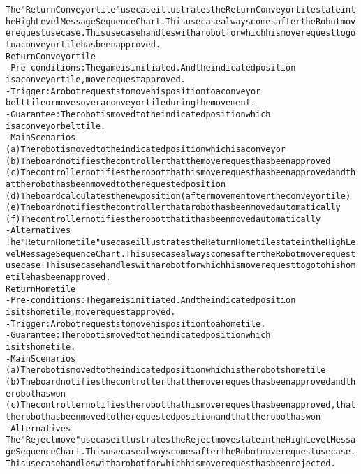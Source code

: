 \begin{alltt}
The "Return Conveyor tile" use case illustrates the Return Conveyor tile state in the High Level Message Sequence Chart. This use case always comes after the Robot move request use case. This use case handles with a robot for which his move request to go to a conveyor tile has been approved. \\

Return Conveyor tile
- Pre-conditions: The game is initiated. And the indicated position
    is a conveyor tile, move request approved.
- Trigger: A robot requests to move his position to a conveyor
    belt tile or moves over a conveyor tile during the movement.
- Guarantee: The robot is moved to the indicated position which
    is a conveyor belt tile.
- Main Scenarios
    (a) The robot is moved to the indicated position which is a conveyor
    (b) The board notifies the controller that the move request has been approved
    (c) The controller notifies the robot that his move request has been approved and that the robot has been moved to the requested position
    (d) The board calculates the new position (after movement over the conveyor tile)
    (e) The board notifies the controller that a robot has been moved automatically
    (f) The controller notifies the robot that it has been moved automatically
- Alternatives \\

The "Return Home tile" use case illustrates the Return Home tile state in the High Level Message Sequence Chart. This use case always comes after the Robot move request use case. This use case handles with a robot for which his move request to go to his home tile has been approved. \\

Return Home tile
- Pre-conditions: The game is initiated. And the indicated position
    is its home tile, move request approved.
- Trigger: A robot requests to move his position to a home tile.
- Guarantee: The robot is moved to the indicated position which
    is its home tile.
- Main Scenarios
    (a) The robot is moved to the indicated position which is the robots home tile
    (b) The board notifies the controller that the move request has been approved and the robot has won
    (c) The controller notifies the robot that his move request has been approved, that the robot has been moved to the requested position and that the robot has won
- Alternatives \\

The "Reject move" use case illustrates the Reject move state in the High Level Message Sequence Chart. This use case always comes after the Robot move request use case. This use case handles with a robot for which his move request has been rejected. \\


\end{alltt}
